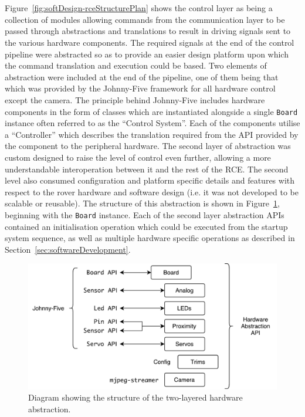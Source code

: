         \\\\
          Figure~\ref{fig:softDesign-rceStructurePlan} shows the control layer as being a collection of modules allowing commands from the communication layer to be passed through abstractions and translations to result in driving signals sent to the various hardware components. The required signals at the end of the control pipeline were abstracted so as to provide an easier design platform upon which the command translation and execution could be based. Two elements of abstraction were included at the end of the pipeline, one of them being that which was provided by the Johnny-Five framework for all hardware control except the camera. The principle behind Johnny-Five includes hardware components in the form of classes which are instantiated alongside a single \texttt{Board} instance often referred to as the ``Control System''. Each of the components utilise a ``Controller'' which describes the translation required from the API provided by the component to the peripheral hardware. The second layer of abstraction was custom designed to raise the level of control even further, allowing a more understandable interoperation between it and the rest of the RCE. The second level also consumed configuration and platform specific details and features with respect to the rover hardware and software design (i.e. it was not developed to be scalable or reusable). The structure of this abstraction is shown in Figure~\ref{fig:softDesign-hardwareAbstractionStructure}, beginning with the \texttt{Board} instance. Each of the second layer abstraction APIs contained an initialisation operation which could be executed from the startup system sequence, as well as multiple hardware specific operations as described in Section~\ref{sec:softwareDevelopment}.
          
          \begin{figure}[h!]
            \centering
            \includegraphics[width=0.7\linewidth]{figures/softDesign-hardwareAbstractionStructure}
            \caption[Diagram showing the structure of the two-layered harware abstraction.]{Diagram showing the structure of the two-layered hardware abstraction.}
            \label{fig:softDesign-hardwareAbstractionStructure}
          \end{figure}
          
